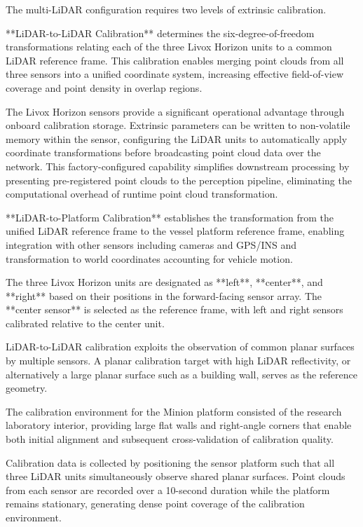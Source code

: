 \documentclass{erauthesis}
\begin{document}

The multi-LiDAR configuration requires two levels of extrinsic calibration.

**LiDAR-to-LiDAR Calibration** determines the six-degree-of-freedom transformations relating each of the three Livox Horizon units to a common LiDAR reference frame.
This calibration enables merging point clouds from all three sensors into a unified coordinate system, increasing effective field-of-view coverage and point density in overlap regions.

The Livox Horizon sensors provide a significant operational advantage through onboard calibration storage.
Extrinsic parameters can be written to non-volatile memory within the sensor, configuring the LiDAR units to automatically apply coordinate transformations before broadcasting point cloud data over the network.
This factory-configured capability simplifies downstream processing by presenting pre-registered point clouds to the perception pipeline, eliminating the computational overhead of runtime point cloud transformation.

**LiDAR-to-Platform Calibration** establishes the transformation from the unified LiDAR reference frame to the vessel platform reference frame, enabling integration with other sensors including cameras and GPS/INS and transformation to world coordinates accounting for vehicle motion.


The three Livox Horizon units are designated as **left**, **center**, and **right** based on their positions in the forward-facing sensor array.
The **center sensor** is selected as the reference frame, with left and right sensors calibrated relative to the center unit.


LiDAR-to-LiDAR calibration exploits the observation of common planar surfaces by multiple sensors.
A planar calibration target with high LiDAR reflectivity, or alternatively a large planar surface such as a building wall, serves as the reference geometry.

The calibration environment for the Minion platform consisted of the research laboratory interior, providing large flat walls and right-angle corners that enable both initial alignment and subsequent cross-validation of calibration quality.

Calibration data is collected by positioning the sensor platform such that all three LiDAR units simultaneously observe shared planar surfaces.
Point clouds from each sensor are recorded over a 10-second duration while the platform remains stationary, generating dense point coverage of the calibration environment.
\end{document}
